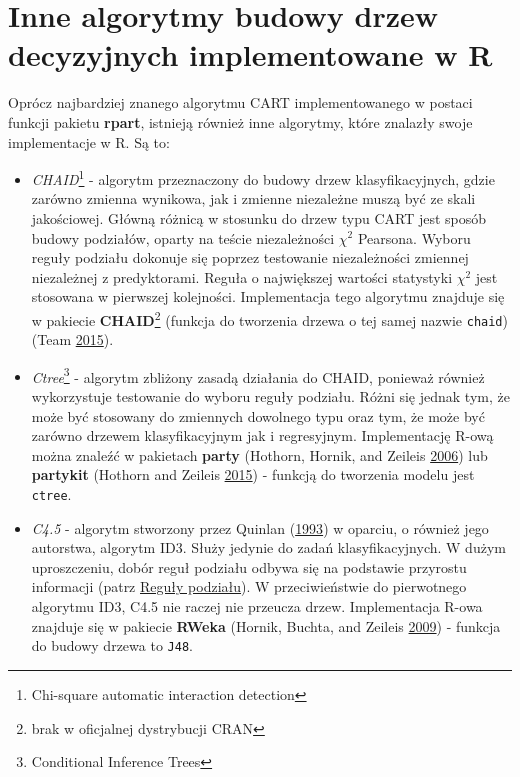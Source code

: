 \documentclass[]{book}
\providecommand{\tightlist}{%
  \setlength{\itemsep}{0pt}\setlength{\parskip}{0pt}}
\let\rmarkdownfootnote\footnote%
\def\footnote{\protect\rmarkdownfootnote}
\theoremstyle{plain}
\theoremstyle{definition}
\theoremstyle{definition}
\theoremstyle{definition}
\theoremstyle{definition}
\theoremstyle{remark}
\begin{document}
\hypertarget{inne-algorytmy-budowy-drzew-decyzyjnych-implementowane-w-r}{%
\section{\texorpdfstring{Inne algorytmy budowy drzew decyzyjnych implementowane w \textbf{R}}{Inne algorytmy budowy drzew decyzyjnych implementowane w R}}\label{inne-algorytmy-budowy-drzew-decyzyjnych-implementowane-w-r}}

Oprócz najbardziej znanego algorytmu CART implementowanego w postaci funkcji pakietu \textbf{rpart}, istnieją również inne algorytmy, które znalazły swoje implementacje w R. Są to:

\begin{itemize}
\tightlist
\item
  \emph{CHAID}\footnote{Chi-square automatic interaction detection} - algorytm przeznaczony do budowy drzew klasyfikacyjnych, gdzie zarówno zmienna wynikowa, jak i zmienne niezależne muszą być ze skali jakościowej. Główną różnicą w stosunku do drzew typu CART jest sposób budowy podziałów, oparty na teście niezależności \(\chi^2\) Pearsona. Wyboru reguły podziału dokonuje się poprzez testowanie niezależności zmiennej niezależnej z predyktorami. Reguła o największej wartości statystyki \(\chi^2\) jest stosowana w pierwszej kolejności. Implementacja tego algorytmu znajduje się w pakiecie \textbf{CHAID}\footnote{brak w oficjalnej dystrybucji CRAN} (funkcja do tworzenia drzewa o tej samej nazwie \texttt{chaid}) (Team \protect\hyperlink{ref-R-CHAID}{2015}).
\item
  \emph{Ctree}\footnote{Conditional Inference Trees} - algorytm zbliżony zasadą działania do CHAID, ponieważ również wykorzystuje testowanie do wyboru reguły podziału. Różni się jednak tym, że może być stosowany do zmiennych dowolnego typu oraz tym, że może być zarówno drzewem klasyfikacyjnym jak i regresyjnym. Implementację R-ową można znaleźć w pakietach \textbf{party} (Hothorn, Hornik, and Zeileis \protect\hyperlink{ref-R-party}{2006}) lub \textbf{partykit} (Hothorn and Zeileis \protect\hyperlink{ref-R-partykit}{2015}) - funkcją do tworzenia modelu jest \texttt{ctree}.
\item
  \emph{C4.5} - algorytm stworzony przez Quinlan (\protect\hyperlink{ref-quinlan1993}{1993}) w oparciu, o również jego autorstwa, algorytm ID3. Służy jedynie do zadań klasyfikacyjnych. W dużym uproszczeniu, dobór reguł podziału odbywa się na podstawie przyrostu informacji (patrz \protect\hyperlink{reguy-podziau}{Reguły podziału}). W przeciwieństwie do pierwotnego algorytmu ID3, C4.5 nie raczej nie przeucza drzew. Implementacja R-owa znajduje się w pakiecie \textbf{RWeka} (Hornik, Buchta, and Zeileis \protect\hyperlink{ref-R-Rweka}{2009}) - funkcja do budowy drzewa to \texttt{J48}.

\end{itemize}
\end{document}
